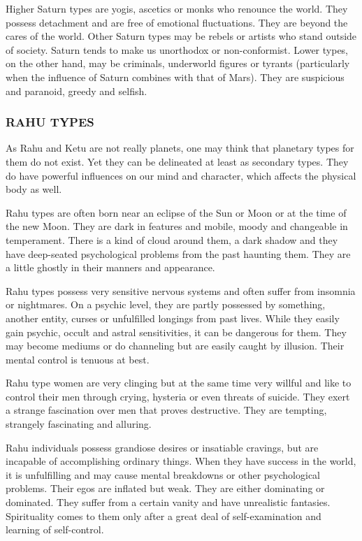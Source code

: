  

Higher Saturn types are yogis, ascetics or monks who renounce the world. They possess detachment and are free of emotional fluctuations. They are beyond the cares of the world. Other Saturn types may be rebels or artists who stand outside of society. Saturn tends to make us unorthodox or non-conformist. Lower types, on the other hand, may be criminals, underworld figures or tyrants (particularly when the influence of Saturn combines with that of Mars). They are suspicious and paranoid, greedy and selfish.

 



\subsubsection{RAHU TYPES}
 

As Rahu and Ketu are not really planets, one may think that planetary types for them do not exist. Yet they can be delineated at least as secondary types. They do have powerful influences on our mind and character, which affects the physical body as well.

 

Rahu types are often born near an eclipse of the Sun or Moon or at the time of the new Moon. They are dark in features and mobile, moody and changeable in temperament. There is a kind of cloud around them, a dark shadow and they have deep-seated psychological problems from the past haunting them. They are a little ghostly in their manners and appearance.

 

Rahu types possess very sensitive nervous systems and often suffer from insomnia or nightmares. On a psychic level, they are partly possessed by something, another entity, curses or unfulfilled longings from past lives. While they easily gain psychic, occult and astral sensitivities, it can be dangerous for them. They may become mediums or do channeling but are easily caught by illusion. Their mental control is tenuous at best.

 

Rahu type women are very clinging but at the same time very willful and like to control their men through crying, hysteria or even threats of suicide. They exert a strange fascination over men that proves destructive. They are tempting, strangely fascinating and alluring.

 

Rahu individuals possess grandiose desires or insatiable cravings, but are incapable of accomplishing ordinary things. When they have success in the world, it is unfulfilling and may cause mental breakdowns or other psychological problems. Their egos are inflated but weak. They are either dominating or dominated. They suffer from a certain vanity and have unrealistic fantasies. Spirituality comes to them only after a great deal of self-examination and learning of self-control.

